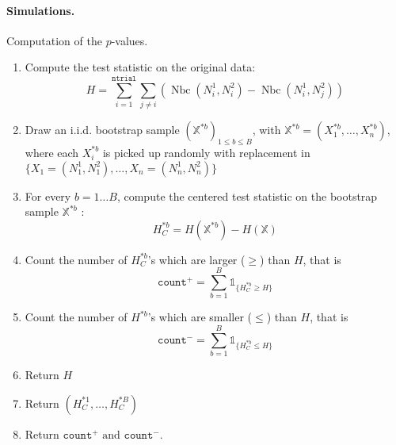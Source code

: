 \documentclass[a4paper,oneside,10pt]{article}
\newcommand{\pa}[1]{\ensuremath{\left( #1 \right)}}
\newcommand{\Nbc}{\operatorname{Nbc}}
\newcommand{\X}{\ensuremath{\mathds{X}}}
\newcommand{\1}[1]{\ensuremath{\mathds{1}_{\{ #1 \}}}}  %
\begin{document}
\paragraph{Simulations.}
Computation of the $p$-values.
\begin{enumerate}
\item Compute the test statistic on the original data: 
$$H=\sum_{i=1}^{\texttt{ntrial}} \sum_{j\neq i}\left(\Nbc(N^1_i,N^2_{i})-\Nbc(N_i^1,N_j^2)\right)$$
\item Draw an i.i.d. bootstrap sample $\pa{\X^{* b}}_{1\leq b\leq B}$, with $\X^{* b}=(X_1^{* b},\ldots, X_n^{* b})$, where each $X_i^{* b}$ is picked up randomly with replacement in $\{X_1=(N^1_1,N^2_1),\ldots, X_n=(N^1_n,N^2_n)\}$
\item For every $b=1\ldots B$, compute the centered test statistic on the bootstrap sample $\X^{* b}$ :
$$H_C^{* b}=H(\X^{*b})-H(\X)$$
\item Count the number of $H_C^{* b}$'s which are larger ($\geq$) than $H$, that is
$$\texttt{count}^+=\sum_{b=1}^B \1{H_C^{* b}\geq H}$$
\item Count the number of $H^{*  b}$'s which are smaller ($\leq$) than $H$, that is
$$\texttt{count}^-=\sum_{b=1}^B \1{H_C^{* b}\leq H}$$
\item Return $H$
\item Return $(H_C^{* 1},\ldots,H_C^{* B})$
\item Return $\texttt{count}^+\textrm{ and }\texttt{count}^-.$
\end{enumerate}
\end{document}
